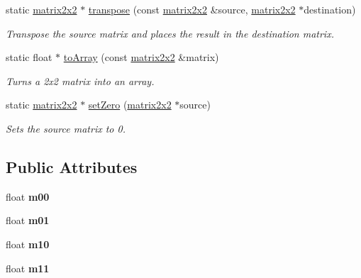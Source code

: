 \begin{DoxyCompactItemize}
static \hyperlink{classflounder_1_1matrix2x2}{matrix2x2} $\ast$ \hyperlink{classflounder_1_1matrix2x2_a8b4dbfda6db7b4a471553be7b45d1064}{transpose} (const \hyperlink{classflounder_1_1matrix2x2}{matrix2x2} \&source, \hyperlink{classflounder_1_1matrix2x2}{matrix2x2} $\ast$destination)
\begin{DoxyCompactList}\small\item\em Transpose the source matrix and places the result in the destination matrix. \end{DoxyCompactList}\item 
static float $\ast$ \hyperlink{classflounder_1_1matrix2x2_a8da6f8c235a0cd3715b037ac615a6e69}{to\+Array} (const \hyperlink{classflounder_1_1matrix2x2}{matrix2x2} \&matrix)
\begin{DoxyCompactList}\small\item\em Turns a 2x2 matrix into an array. \end{DoxyCompactList}\item 
static \hyperlink{classflounder_1_1matrix2x2}{matrix2x2} $\ast$ \hyperlink{classflounder_1_1matrix2x2_af3c4426514b430d36cd8c79e029d53ed}{set\+Zero} (\hyperlink{classflounder_1_1matrix2x2}{matrix2x2} $\ast$source)
\begin{DoxyCompactList}\small\item\em Sets the source matrix to 0. \end{DoxyCompactList}\end{DoxyCompactItemize}
\subsection*{Public Attributes}
\begin{DoxyCompactItemize}
\item 
\mbox{\label{classflounder_1_1matrix2x2_aca77c10d0a122875abf700bf38394349}} 
float {\bfseries m00}
\item 
\mbox{\label{classflounder_1_1matrix2x2_a506dfc5c38f06a81e2a7c91b435a8bf8}} 
float {\bfseries m01}
\item 
\mbox{\label{classflounder_1_1matrix2x2_abad4089daa277ff2ff6c0125993a2b2f}} 
float {\bfseries m10}
\item 
\mbox{\label{classflounder_1_1matrix2x2_a1129c51bc9dedb93521cca45459e6da5}} 
float {\bfseries m11}
\end{DoxyCompactItemize}


